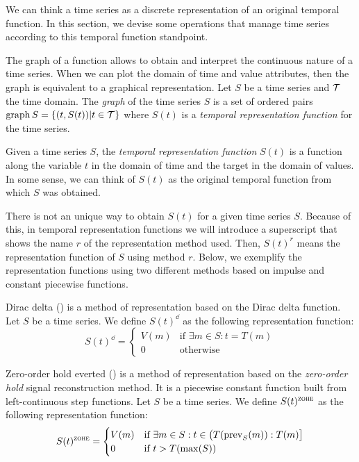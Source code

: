 We can think a time series as a discrete representation of an original
temporal function. In this section, we devise some operations that
manage time series according to this temporal function standpoint.

The graph of a function allows to obtain and interpret the continuous
nature of a time series. When we can plot the domain of time and value
attributes, then the graph is equivalent to a graphical
representation.  Let $S$ be a time series and $\cal{T}$ the time
domain. The \emph{graph} of the time series $S$ is a set of ordered
pairs $\operatorname*{graph} S =\{(t,S(t))|t\in \cal{T}\}$ where $S(t)$ is a
\emph{temporal representation function} for the time series.

Given a time series $S$, the \emph{temporal representation function}
$S(t)$ is a function along the variable $t$ in the domain of time and
the target in the domain of values. In some sense, we can think of
$S(t)$ as the original temporal function from which $S$ was obtained.

There is not an unique way to obtain $S(t)$ for a given time series
$S$. Because of this, in temporal representation functions we will
introduce a superscript that shows the name $r$ of the representation
method used. Then, $S(t)^r$ means the representation function of $S$
using method $r$. Below, we exemplify the representation functions
using two different methods based on impulse and constant piecewise
functions.


\begin{definition} 
  Dirac delta (\dd) is a method of representation based on the Dirac
  delta function. Let $S$ be a time series. We define $S(t)^\dd$ as
  the following \dd{} representation function:
  \[
  S(t)^\dd
  =  \begin{cases}
          V(m) & \text{if } \exists m\in S:t=T(m) \\
          0    & \text{otherwise}
  \end{cases}
  \]
\end{definition}

\begin{definition}
  Zero-order hold everted (\zohe{}) is a method of representation
  based on the \emph{zero-order hold} signal reconstruction method. It
  is a piecewise constant function built from left-continuous step
  functions.  Let $S$ be a time series. We define $S(t)^\zohe$ as the
  following representation function:
  \[
  S(t)^\zohe 
  = \begin{cases}
    V(m) & \text{if } \exists m\in S: t\in \big(T(\prev_S(m)):T(m)\big]\\
    0    & \text{if } t > T(\max(S)) 
  \end{cases}
  \]
\end{definition}

